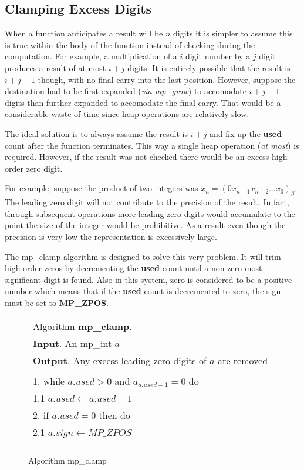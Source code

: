 \documentclass[b5paper]{book}
\begin{document}
\subsection{Clamping Excess Digits}
When a function anticipates a result will be $n$ digits it is simpler to assume this is true within the body of 
the function instead of checking during the computation.  For example, a multiplication of a $i$ digit number by a 
$j$ digit produces a result of at most $i + j$ digits.  It is entirely possible that the result is $i + j - 1$ 
though, with no final carry into the last position.  However, suppose the destination had to be first expanded 
(\textit{via mp\_grow}) to accomodate $i + j - 1$ digits than further expanded to accomodate the final carry.  
That would be a considerable waste of time since heap operations are relatively slow.

The ideal solution is to always assume the result is $i + j$ and fix up the \textbf{used} count after the function
terminates.  This way a single heap operation (\textit{at most}) is required.  However, if the result was not checked
there would be an excess high order zero digit.  

For example, suppose the product of two integers was $x_n = (0x_{n-1}x_{n-2}...x_0)_{\beta}$.  The leading zero digit 
will not contribute to the precision of the result.  In fact, through subsequent operations more leading zero digits would
accumulate to the point the size of the integer would be prohibitive.  As a result even though the precision is very 
low the representation is excessively large.  

The mp\_clamp algorithm is designed to solve this very problem.  It will trim high-order zeros by decrementing the 
\textbf{used} count until a non-zero most significant digit is found.  Also in this system, zero is considered to be a 
positive number which means that if the \textbf{used} count is decremented to zero, the sign must be set to 
\textbf{MP\_ZPOS}.

\begin{figure}[here]
\begin{center}
\begin{tabular}{l}
\hline Algorithm \textbf{mp\_clamp}. \\
\textbf{Input}.   An mp\_int $a$ \\
\textbf{Output}.  Any excess leading zero digits of $a$ are removed \\
\hline \\
1.  while $a.used > 0$ and $a_{a.used - 1} = 0$ do \\
\hspace{+3mm}1.1  $a.used \leftarrow a.used - 1$ \\
2.  if $a.used = 0$ then do \\
\hspace{+3mm}2.1  $a.sign \leftarrow MP\_ZPOS$ \\
\hline \\
\end{tabular}
\end{center}
\caption{Algorithm mp\_clamp}
\end{figure}
\end{document}

